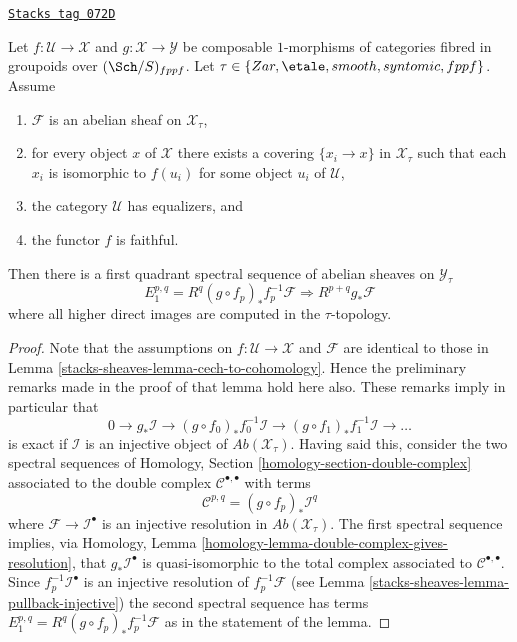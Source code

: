 \begin{lemma}
\label{stacks-sheaves-lemma-cech-to-cohomology-relative}
\href{https://stacks.math.columbia.edu/tag/072D}{\texttt{Stacks tag 072D}}

Let $f : \mathcal{U} \to \mathcal{X}$ and
$g : \mathcal{X} \to \mathcal{Y}$
be composable $1$-morphisms of categories fibred
in groupoids over $(\Sch/S)_{fppf}$. Let
$\tau \in \{Zar, \etale, smooth, syntomic, \linebreak[0] fppf\}$.
Assume
\begin{enumerate}
\item $\mathcal{F}$ is an abelian sheaf on $\mathcal{X}_\tau$,
\item for every object $x$ of $\mathcal{X}$ there exists a covering
$\{x_i \to x\}$ in $\mathcal{X}_\tau$ such that each $x_i$ is isomorphic
to $f(u_i)$ for some object $u_i$ of $\mathcal{U}$,
\item the category $\mathcal{U}$ has equalizers, and
\item the functor $f$ is faithful.
\end{enumerate}
Then there is a first quadrant spectral sequence of abelian sheaves
on $\mathcal{Y}_\tau$
$$
E_1^{p, q} = R^q(g \circ f_p)_*f_p^{-1}\mathcal{F}
\Rightarrow
R^{p + q}g_*\mathcal{F}
$$
where all higher direct images are computed in the $\tau$-topology.
\end{lemma}

\begin{proof}
Note that the assumptions on $f : \mathcal{U} \to \mathcal{X}$
and $\mathcal{F}$ are identical to those in
Lemma \ref{stacks-sheaves-lemma-cech-to-cohomology}.
Hence the preliminary remarks made in the proof of that lemma
hold here also. These remarks imply in particular that
$$
0 \to g_*\mathcal{I} \to
(g \circ f_0)_*f_0^{-1}\mathcal{I} \to
(g \circ f_1)_*f_1^{-1}\mathcal{I} \to \ldots
$$
is exact if $\mathcal{I}$ is an injective object of
$\textit{Ab}(\mathcal{X}_\tau)$.
Having said this, consider the two spectral sequences of
Homology, Section \ref{homology-section-double-complex}
associated to the double complex $\mathcal{C}^{\bullet, \bullet}$ with terms
$$
\mathcal{C}^{p, q} = (g \circ f_p)_*\mathcal{I}^q
$$
where $\mathcal{F} \to \mathcal{I}^\bullet$ is an injective resolution
in $\textit{Ab}(\mathcal{X}_\tau)$. The first spectral sequence implies, via
Homology, Lemma \ref{homology-lemma-double-complex-gives-resolution},
that $g_*\mathcal{I}^\bullet$ is quasi-isomorphic to the total complex
associated to $\mathcal{C}^{\bullet, \bullet}$.
Since $f_p^{-1}\mathcal{I}^\bullet$ is an injective resolution of
$f_p^{-1}\mathcal{F}$ (see
Lemma \ref{stacks-sheaves-lemma-pullback-injective})
the second spectral sequence has terms
$E_1^{p, q} = R^q(g \circ f_p)_*f_p^{-1}\mathcal{F}$ as in the statement
of the lemma.
\end{proof}

